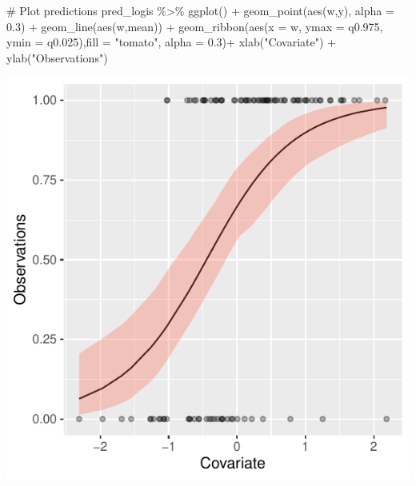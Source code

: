 \documentclass[
  letterpaper,
  DIV=11,
  numbers=noendperiod]{scrartcl}
\newenvironment{Shaded}{\begin{snugshade}}{\end{snugshade}}
\newcommand{\AttributeTok}[1]{\textcolor[rgb]{0.40,0.45,0.13}{#1}}
\newcommand{\CommentTok}[1]{\textcolor[rgb]{0.37,0.37,0.37}{#1}}
\newcommand{\FloatTok}[1]{\textcolor[rgb]{0.68,0.00,0.00}{#1}}
\newcommand{\FunctionTok}[1]{\textcolor[rgb]{0.28,0.35,0.67}{#1}}
\newcommand{\NormalTok}[1]{\textcolor[rgb]{0.00,0.23,0.31}{#1}}
\newcommand{\SpecialCharTok}[1]{\textcolor[rgb]{0.37,0.37,0.37}{#1}}
\newcommand{\StringTok}[1]{\textcolor[rgb]{0.13,0.47,0.30}{#1}}
\begin{document}
\begin{tcolorbox}
\begin{Shaded}
\begin{Highlighting}[]
\CommentTok{\# Plot predictions}
\NormalTok{pred\_logis }\SpecialCharTok{\%\textgreater{}\%} \FunctionTok{ggplot}\NormalTok{() }\SpecialCharTok{+} 
  \FunctionTok{geom\_point}\NormalTok{(}\FunctionTok{aes}\NormalTok{(w,y), }\AttributeTok{alpha =} \FloatTok{0.3}\NormalTok{) }\SpecialCharTok{+}
  \FunctionTok{geom\_line}\NormalTok{(}\FunctionTok{aes}\NormalTok{(w,mean)) }\SpecialCharTok{+}
    \FunctionTok{geom\_ribbon}\NormalTok{(}\FunctionTok{aes}\NormalTok{(}\AttributeTok{x =}\NormalTok{ w, }\AttributeTok{ymax =}\NormalTok{ q0}\FloatTok{.975}\NormalTok{, }\AttributeTok{ymin =}\NormalTok{ q0}\FloatTok{.025}\NormalTok{),}\AttributeTok{fill =} \StringTok{"tomato"}\NormalTok{, }\AttributeTok{alpha =} \FloatTok{0.3}\NormalTok{)}\SpecialCharTok{+}
  \FunctionTok{xlab}\NormalTok{(}\StringTok{"Covariate"}\NormalTok{) }\SpecialCharTok{+} \FunctionTok{ylab}\NormalTok{(}\StringTok{"Observations"}\NormalTok{)}
\end{Highlighting}
\end{Shaded}

\begin{center}
\includegraphics{day1_practical_files/figure-pdf/unnamed-chunk-52-1.pdf}
\end{center}

\end{tcolorbox}
\end{document}
